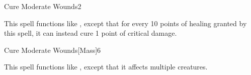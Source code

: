 \begin{spellsection}{Cure Moderate Wounds}{2}
    \begin{spellheader}
    \end{spellheader}
    \begin{spellcontent}
        \begin{spelltargetinginfo}
        \end{spelltargetinginfo}
        \begin{spelleffects}
            \spellspecial This spell functions like , except that for every 10 points of healing granted by this spell, it can instead cure 1 point of critical damage.
        \end{spelleffects}
    \end{spellcontent}
    \begin{spellfooter}
        \miscastrandom
    \end{spellfooter}
\end{spellsection}

\begin{spellsection}{Cure Moderate Wounds}[Mass]{6}
    \begin{spellheader}
    \end{spellheader}
    \begin{spellcontent}
        \begin{spelltargetinginfo}
        \end{spelltargetinginfo}
        \begin{spelleffects}
            \spellspecial This spell functions like , except that it affects multiple creatures.
        \end{spelleffects}
    \end{spellcontent}
    \begin{spellfooter}
        \miscastexplode
    \end{spellfooter}
\end{spellsection}

